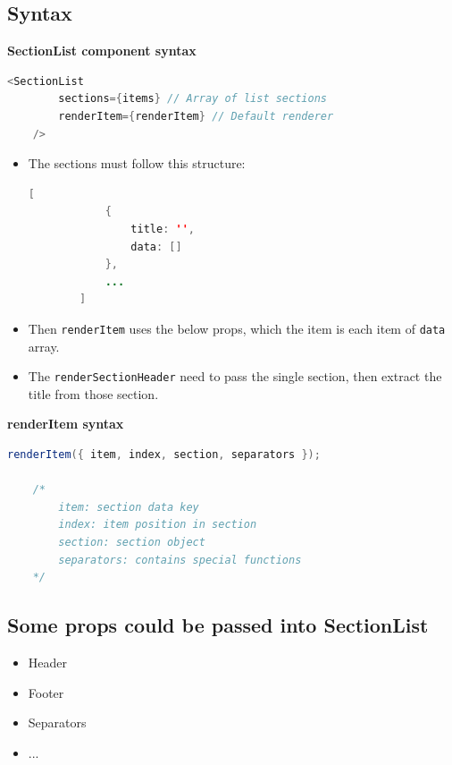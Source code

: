 \subsection{Syntax}
\textbf{SectionList component syntax}
\begin{lstlisting}[language=Java, numbers=none]
    <SectionList
        sections={items} // Array of list sections
        renderItem={renderItem} // Default renderer
    />
\end{lstlisting}
\begin{itemize}
    \item The sections must follow this structure:
    \begin{lstlisting}[language=Java, numbers=none]
        [
            {
                title: '',
                data: []
            },
            ...
        ]
    \end{lstlisting}

    \item Then \texttt{renderItem} uses the below props, which the item is each item of \texttt{data} array.
    \item The \texttt{renderSectionHeader} need to pass the single section, then extract the title from those section.
\end{itemize}

\textbf{renderItem syntax}
\begin{lstlisting}[language=Java, numbers=none]
    renderItem({ item, index, section, separators });

    /*
        item: section data key
        index: item position in section
        section: section object
        separators: contains special functions
    */
\end{lstlisting}

\subsection{Some props could be passed into SectionList}
\begin{itemize}
    \item Header
    \item Footer
    \item Separators
    \item ...
\end{itemize}

